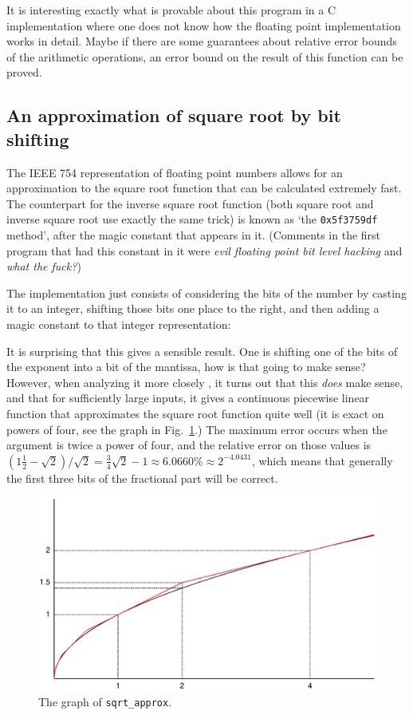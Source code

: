 \documentclass{article}
\begin{document}
It is interesting exactly what is provable about this program
in a C implementation where one does not know how the floating
point implementation works in detail.
Maybe if there are some guarantees about relative error bounds
of the arithmetic operations, an error bound on the result of this
function can be proved.

\subsection{An approximation of square root by bit shifting}
The IEEE 754 representation of floating point numbers allows
for an approximation to the square root function
that can be calculated extremely fast.
The counterpart for the inverse square root function (both square
root and inverse square root
use exactly the same trick) is known
as `the \lstinline|0x5f3759df| method',
after the magic constant that appears in it.
(Comments in the first program that had this constant
in it were \emph{evil floating point bit level hacking} and \emph{what the fuck?})

The implementation just consists of considering the bits of the number by casting it to an integer,
shifting those bits one place to the right, and then adding a magic constant to that integer representation:

It is surprising that this gives a sensible result.
One is shifting one of the bits of the exponent into a bit of the
mantissa, how is that going to make sense?
However, when analyzing it more closely \cite{bli:97}, it turns
out that this \emph{does} make sense, and that for sufficiently large inputs, it gives a continuous piecewise linear function that 
approximates the square root function quite well (it is exact
on powers of four, see the graph in Fig.~\ref{sqrt_approx}.)
The maximum error occurs when the argument is twice a power of four, and the
relative error on those values is $(1\frac{1}{2} - \sqrt{2})/\sqrt{2} = \frac{3}{4}\sqrt{2} - 1 \approx 6.0660\% \approx 2^{-4.0431}$,
which means that generally the first three bits of the fractional part will be correct.
\begin{figure}
\begin{center}
\includegraphics[width=.9\textwidth]{sqrt_approx}
\end{center}
\caption{The graph of \lstinline|sqrt_approx|.}\label{sqrt_approx}
\end{figure}
\end{document}
